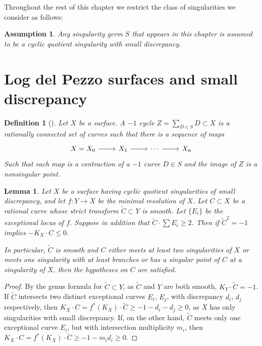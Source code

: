 \documentclass[12pt,a4paper]{book}      %
\newtheorem{dfn}[thm]{Definition}
\newtheorem{lem}[thm]{Lemma}
\newtheorem{assumption}[thm]{Assumption}
\newcommand{\wt}[1]{\widetilde #1}
\begin{document}
Throughout the rest of this chapter we restrict the class of singularities we consider as follows:

\begin{assumption}
Any singularity germ $S$ that appears in this chapter is assumed to be a cyclic
quotient singularity with small discrepancy.
\end{assumption}

\section{Log del Pezzo surfaces and small discrepancy}

\begin{dfn}[\cite{Artin}]
Let $X$ be a surface. A $-1$ cycle $Z = \sum_{D \in S} D \subset X$ is a rationally connected set of curves such that there is a sequence of maps 
\[
\begin{tikzcd}
X=X_0 \arrow[r] & X_1 \arrow[r] & \cdots \arrow[r] & X_n
\end{tikzcd}
\]
Such that each map is a contraction of a $-1$ curve $D \in S$ and the image of $Z$ is a nonsingular point.
\end{dfn}

\begin{lem}\label{lem!badcurve}
Let $X$ be a surface having cyclic quotient singularities of small discrepancy, and let  $f \colon Y \rightarrow X$ be the minimal resolution of $X$. Let $C \subset X$ be a rational curve whose 
strict transform $\widetilde C \subset Y$ is smooth. Let $\{ E_i \}$ be the exceptional locus of $f$. Suppose in addition that 
$\widetilde C \cdot \sum E_i \geq 2$.
Then if $\widetilde C^2 = -1$ implies $-K_X \cdot C \leq 0$.

In particular, $\widetilde C$ is smooth and
$C$ either meets at least two singularities of $X$ or meets one singularity
with at least branches or has a singular point of $C$ at a singularity of $X$,
then the hypotheses on $C$ are satisfied.
\end{lem}
\begin{proof}
By the genus formula for $\widetilde C\subset Y$, as $\widetilde C$ and $Y$ are both smooth,
$K_Y \cdot \widetilde C = -1$. If $\wt C$ intersects two distinct exceptional curves $E_i$, $E_j$,
with discrepancy $d_i$, $d_j$ respectively, then
 $K_X \cdot C = f^*(K_X) \cdot \widetilde C \geq -1 - d_i - d_j  \geq 0$,
 as $X$ has only singularities with small discrepancy. 
 If, on the other hand, $\wt C$ meets only one exceptional curve $E_i$, but with intersection
multiplicity $m_i$, then $K_X \cdot C = f^*(K_X) \cdot \widetilde C \geq -1 - m_id_i  \geq 0$.
\end{proof}
\end{document}
